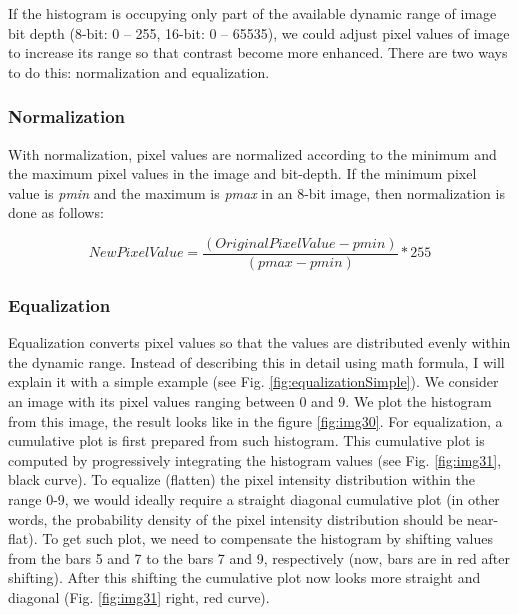 If the histogram is occupying only part of the available dynamic range
of image bit depth (8-bit: 0 -- 255, 16-bit: 0 -- 65535), we could
adjust pixel values of image to increase its range so that contrast become more
enhanced. There are two ways to do this: normalization and
equalization. 

\subsubsection{Normalization}

With normalization, pixel values are normalized according to the
minimum and the maximum pixel values in the image and bit-depth. If the minimum pixel value is
\textit{pmin} and the maximum is \textit{pmax} in an 8-bit image, then normalization is done as follows:

\begin{equation*}
\mathit{NewPixelValue}=\frac{(\mathit{OriginalPixelValue}-\mathit{pmin})}{(\mathit{pmax}-\mathit{pmin})}\ast
255
\end{equation*}

\subsubsection{Equalization}

Equalization converts pixel values so that the values are distributed
evenly within the dynamic range. Instead of describing this in detail
using math formula, I will explain it with a simple example (see Fig. \ref{fig:equalizationSimple}). 
We consider an image with its pixel values ranging
between 0 and 9. We plot the histogram from this image, the result looks
like in the figure \ref{fig:img30}. For equalization, a cumulative
plot is first prepared from such histogram. This cumulative plot is computed by progressively integrating the histogram values (see 
Fig. \ref{fig:img31}, black curve).
To equalize (flatten) the pixel intensity distribution within the range 0-9, we would ideally require a straight diagonal
cumulative plot (in other words, the probability density of the 
pixel intensity distribution should be near-flat). To get such plot, we need to compensate the histogram by shifting values from the bars 5 and 7 to the bars 7 and 9, respectively (now, bars are in
red after shifting). After this shifting the cumulative plot now looks
more straight and diagonal (Fig. \ref{fig:img31} right, red curve).


